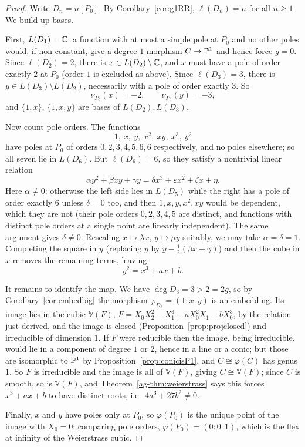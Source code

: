 \documentclass[a4paper]{scrartcl}
\newcommand{\V}{\mathbb{V}}
\begin{document}
\begin{proof}
	Write $D_n = n[P_0]$. By Corollary~\ref{cor:g1RR}, $\ell(D_n) = n$ for all $n \geq 1$. We build up bases.

	First, $L(D_1) = \mathbb{C}$: a function with at most a simple pole at $P_0$ and no other poles would, if non-constant, give a degree $1$ morphism $C \to \mathbb{P}^1$ and hence force $g = 0$. Since $\ell(D_2) = 2$, there is $x \in L(D_2)\setminus\mathbb{C}$, and $x$ must have a pole of order exactly $2$ at $P_0$ (order $1$ is excluded as above). Since $\ell(D_3) = 3$, there is $y \in L(D_3)\setminus L(D_2)$, necessarily with a pole of order exactly $3$. So
	$$\nu_{P_0}(x) = -2, \qquad \nu_{P_0}(y) = -3,$$
	and $\{1,x\}$, $\{1,x,y\}$ are bases of $L(D_2), L(D_3)$.

	Now count pole orders. The functions
	$$1,\ x,\ y,\ x^2,\ xy,\ x^3,\ y^2$$
	have poles at $P_0$ of orders $0,2,3,4,5,6,6$ respectively, and no poles elsewhere; so all seven lie in $L(D_6)$. But $\ell(D_6) = 6$, so they satisfy a nontrivial linear relation
	$$\alpha y^2 + \beta xy + \gamma y = \delta x^3 + \varepsilon x^2 + \zeta x + \eta.$$
	Here $\alpha \neq 0$: otherwise the left side lies in $L(D_5)$ while the right has a pole of order exactly $6$ unless $\delta = 0$ too, and then $1,x,y,x^2,xy$ would be dependent, which they are not (their pole orders $0,2,3,4,5$ are distinct, and functions with distinct pole orders at a single point are linearly independent). The same argument gives $\delta \neq 0$. Rescaling $x \mapsto \lambda x$, $y \mapsto \mu y$ suitably, we may take $\alpha = \delta = 1$. Completing the square in $y$ (replacing $y$ by $y - \tfrac12(\beta x + \gamma)$) and then the cube in $x$ removes the remaining terms, leaving
	$$y^2 = x^3 + ax + b.$$

	It remains to identify the map. We have $\deg D_3 = 3 > 2 = 2g$, so by Corollary~\ref{cor:embedbig} the morphism $\varphi_{D_3} = (1:x:y)$ is an embedding. Its image lies in the cubic $\V(F)$, $F = X_0X_2^2 - X_1^3 - aX_0^2X_1 - bX_0^3$, by the relation just derived, and the image is closed (Proposition~\ref{prop:projclosed}) and irreducible of dimension $1$. If $F$ were reducible then the image, being irreducible, would lie in a component of degree $1$ or $2$, hence in a line or a conic; but those are isomorphic to $\mathbb{P}^1$ by Proposition~\ref{prop:conicisP1}, and $C \cong \varphi(C)$ has genus $1$. So $F$ is irreducible and the image is all of $\V(F)$, giving $C \cong \V(F)$; since $C$ is smooth, so is $\V(F)$, and Theorem~\ref{ag-thm:weierstrass} says this forces $x^3+ax+b$ to have distinct roots, i.e.\ $4a^3+27b^2 \neq 0$.

	Finally, $x$ and $y$ have poles only at $P_0$, so $\varphi(P_0)$ is the unique point of the image with $X_0 = 0$; comparing pole orders, $\varphi(P_0) = (0:0:1)$, which is the flex at infinity of the Weierstrass cubic.
\end{proof}
\end{document}
